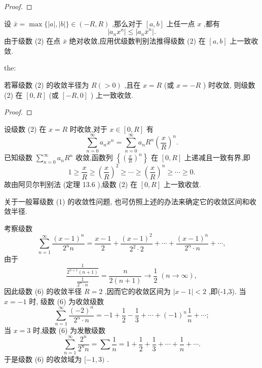 \begin{proof}

\end{proof}
设 \(\bar{x} = \max \{ \left| a\right| ,\left| b\right| \}  \in  \left( {-R,R}\right)\) ,那么对于 \(\left\lbrack  {a,b}\right\rbrack\) 上任一点 \(x\) ,都有
\[
\left| {{a}_{n}{x}^{n}}\right|  \leq  \left| {{a}_{n}{\bar{x}}^{n}}\right| .
\]
由于级数 (2) 在点 \(\bar{x}\) 绝对收敛,应用优级数判别法推得级数 (2) 在 \(\left\lbrack  {a,b}\right\rbrack\) 上一致收敛.

\begin{theorem}{}{the:}

\end{theorem}
 若幂级数 (2) 的收敛半径为 \(R\left( { > 0}\right)\) ,且在 \(x = R\) (或 \(x =  - R\) ) 时收敛, 则级数 (2) 在 \(\left\lbrack  {0,R}\right\rbrack\) (或 \(\left\lbrack  {-R,0}\right\rbrack\) ) 上一致收敛.

\begin{proof}

\end{proof}
设级数 (2) 在 \(x = R\) 时收敛,对于 \(x \in  \left\lbrack  {0,R}\right\rbrack\) 有
\[
\mathop{\sum }\limits_{{n = 0}}^{\infty }{a}_{n}{x}^{n} = \mathop{\sum }\limits_{{n = 0}}^{\infty }{a}_{n}{R}^{n}{\left( \frac{x}{R}\right) }^{n}.
\]
已知级数 \(\mathop{\sum }\limits_{{n = 0}}^{\infty }{a}_{n}{R}^{n}\) 收敛,函数列 \(\left\{  {\left( \frac{x}{R}\right) }^{n}\right\}\) 在 \(\left\lbrack  {0,R}\right\rbrack\) 上递减且一致有界,即
\[
1 \geq  \frac{x}{R} \geq  {\left( \frac{x}{R}\right) }^{2} \geq  \cdots  \geq  {\left( \frac{x}{R}\right) }^{n} \geq  \cdots  \geq  0.
\]
故由阿贝尔判别法 (定理 13.6 ),级数 (2) 在 \(\left\lbrack  {0,R}\right\rbrack\) 上一致收敛.

关于一般幂级数 (1) 的收敛性问题, 也可仿照上述的办法来确定它的收敛区间和收敛半径.

\begin{example}

\end{example}
考察级数
\[
\mathop{\sum }\limits_{{n = 1}}^{\infty }\frac{{\left( x - 1\right) }^{n}}{{2}^{n}n} = \frac{x - 1}{2} + \frac{{\left( x - 1\right) }^{2}}{{2}^{2} \cdot  2} + \cdots  + \frac{{\left( x - 1\right) }^{n}}{{2}^{n} \cdot  n} + \cdots , \tag{6}
\]
由于
\[
\frac{\frac{1}{{2}^{n + 1}\left( {n + 1}\right) }}{\frac{1}{{2}^{n} \cdot  n}} = \frac{n}{2\left( {n + 1}\right) } \rightarrow  \frac{1}{2}\;\left( {n \rightarrow  \infty }\right) ,
\]
因此级数 (6) 的收敛半径 \(R = 2\) ,因而它的收敛区间为 \(\left| {x - 1}\right|  < 2\) ,即(-1,3). 当 \(x =  - 1\) 时, 级数 (6) 为收敛级数
\[
\mathop{\sum }\limits_{{n = 1}}^{\infty }\frac{{\left( -2\right) }^{n}}{{2}^{n} \cdot  n} =  - 1 + \frac{1}{2} - \frac{1}{3} + \cdots  + {\left( -1\right) }^{n}\frac{1}{n} + \cdots ;
\]
当 \(x = 3\) 时,级数 (6) 为发散级数
\[
\mathop{\sum }\limits_{{n = 1}}^{\infty }\frac{{2}^{n}}{{2}^{n}n} = \sum \frac{1}{n} = 1 + \frac{1}{2} + \frac{1}{3} + \cdots  + \frac{1}{n} + \cdots .
\]
于是级数 (6) 的收敛域为 \(\lbrack  - 1,3)\) .

